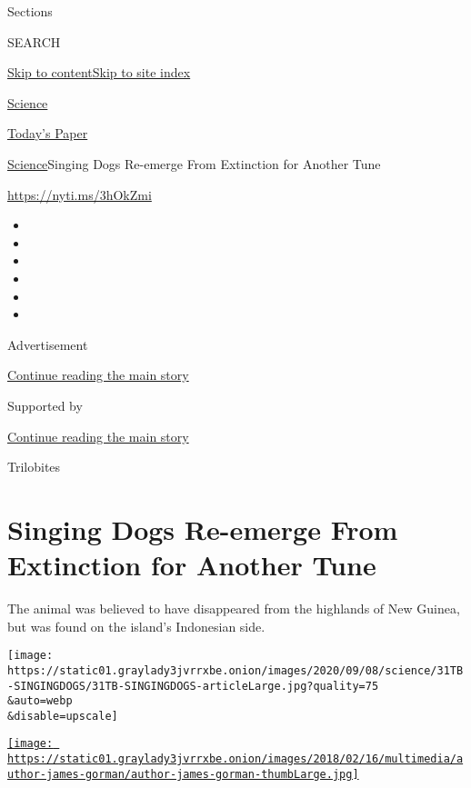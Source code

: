 Sections

SEARCH

\protect\hyperlink{site-content}{Skip to
content}\protect\hyperlink{site-index}{Skip to site index}

\href{https://www.nytimes3xbfgragh.onion/section/science}{Science}

\href{https://myaccount.nytimes3xbfgragh.onion/auth/login?response_type=cookie\&client_id=vi}{}

\href{https://www.nytimes3xbfgragh.onion/section/todayspaper}{Today's
Paper}

\href{/section/science}{Science}\textbar{}Singing Dogs Re-emerge From
Extinction for Another Tune

\url{https://nyti.ms/3hOkZmi}

\begin{itemize}
\item
\item
\item
\item
\item
\item
\end{itemize}

Advertisement

\protect\hyperlink{after-top}{Continue reading the main story}

Supported by

\protect\hyperlink{after-sponsor}{Continue reading the main story}

Trilobites

\hypertarget{singing-dogs-re-emerge-from-extinction-for-another-tune}{%
\section{Singing Dogs Re-emerge From Extinction for Another
Tune}\label{singing-dogs-re-emerge-from-extinction-for-another-tune}}

The animal was believed to have disappeared from the highlands of New
Guinea, but was found on the island's Indonesian side.

\texttt{[image: https://static01.graylady3jvrrxbe.onion/images/2020/09/08/science/31TB-SINGINGDOGS/31TB-SINGINGDOGS-articleLarge.jpg?quality=75\\\&auto=webp\\\&disable=upscale]}

\href{https://www.nytimes3xbfgragh.onion/by/james-gorman}{\texttt{[image: https://static01.graylady3jvrrxbe.onion/images/2018/02/16/multimedia/author-james-gorman/author-james-gorman-thumbLarge.jpg]}}

